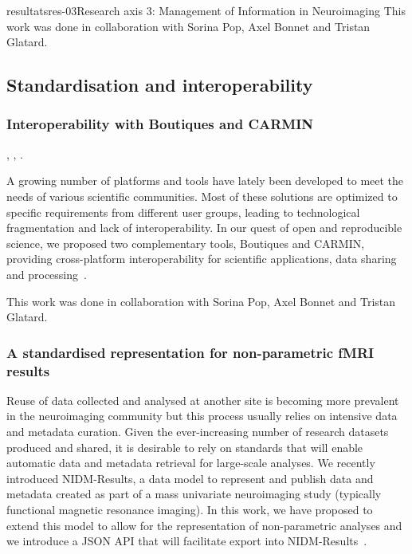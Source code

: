 \documentclass{ra2018}
\begin{document}
\begin{module}{resultats}{res-03}{Research axis 3: Management of Information in Neuroimaging}
This work was done in collaboration with Sorina Pop, Axel Bonnet and Tristan Glatard.

\subsection{Standardisation and interoperability}
\subsubsection{Interoperability with Boutiques and CARMIN}
\begin{participants}
      ,
      ,
      .
\end{participants}
A growing number of platforms and tools have lately been developed to meet the needs of various scientific communities. Most of these solutions are optimized to specific requirements from different user groups, leading to technological fragmentation and lack of interoperability. In our quest of open and reproducible science, we proposed two complementary tools, Boutiques and CARMIN, providing cross-platform interoperability for scientific applications, data sharing and processing~\cite{camarasupop:inserm-01846997}.

This work was done in collaboration with Sorina Pop, Axel Bonnet and Tristan Glatard.

\subsubsection{A standardised representation for non-parametric fMRI results}
\begin{participants}
\end{participants}
Reuse of data collected and analysed at another site is becoming more prevalent in the neuroimaging community but this process usually relies on intensive data and metadata curation. Given the ever-increasing number of research datasets produced and shared, it is desirable to rely on standards that will enable automatic data and metadata retrieval for large-scale analyses. We recently introduced NIDM-Results, a data model to represent and publish data and metadata created as part of a mass univariate neuroimaging study (typically functional magnetic resonance imaging). In this work, we have proposed to extend this model to allow for the representation of non-parametric analyses and we introduce a JSON API that will facilitate export into NIDM-Results~\cite{maumet:inserm-01828914}.


\end{module}
\end{document}

